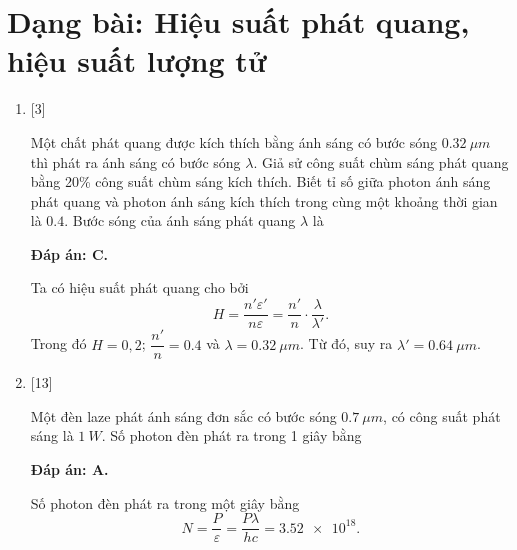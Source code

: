 \section{Dạng bài: Hiệu suất phát quang, hiệu suất lượng tử}
\begin{enumerate}[label=\bfseries Câu \arabic*:]

		\item {} 
	
		\cauhoi
		{Một chất phát quang được kích thích bằng ánh sáng có bước sóng $ \SI{0,32}{\mu m} $ thì phát ra ánh sáng có bước sóng $\lambda $. Giả sử công suất chùm sáng phát quang bằng 20\% công suất chùm sáng kích thích. Biết tỉ số giữa photon ánh sáng phát quang và photon ánh sáng kích thích trong cùng một khoảng thời gian là $ \num{0,4} $. Bước sóng của ánh sáng phát quang $ \lambda $ là
		}
	
		\loigiai
		{		\textbf{Đáp án: C.}
		
Ta có hiệu suất phát quang cho bởi
$$
	H = \dfrac{n' \varepsilon'}{n \varepsilon} = \dfrac{n'}{n} \cdot \dfrac{\lambda}{\lambda'}.
$$	
Trong đó $ H = 0,2 $; $ \dfrac{n'}{n} = \num{0,4}$ và $ \lambda = \SI{0,32}{\mu m}$.
Từ đó, suy ra $ \lambda' = \SI{0,64}{\mu m}$.
		}
		
		\item {}[13]
	
		\cauhoi
		{Một đèn laze phát ánh sáng đơn sắc có bước sóng $ \SI{0,7}{\mu m} $, có công suất phát sáng là $ \SI{1}{W} $. Số photon đèn phát ra trong 1 giây bằng
		}
	
		\loigiai
		{		\textbf{Đáp án: A.}
		
Số photon đèn phát ra trong một giây bằng
$$
	N = \dfrac{P}{\varepsilon} = \dfrac{P \lambda}{hc} = \num{3,52e18}.
$$	
		}
		
	
\end{enumerate}

